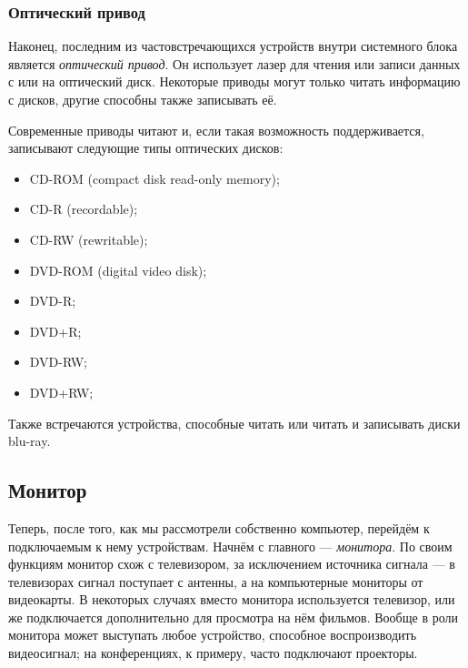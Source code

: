 \subsubsection{Оптический привод}\label{base:introduction:components:opticaldrive}
Наконец, последним из частовстречающихся устройств внутри системного блока является \emph{оптический привод}.
Он использует лазер для чтения или записи данных с или на оптический диск.
Некоторые приводы могут только читать информацию с дисков, другие способны также записывать её.

Современные приводы читают и, если такая возможность поддерживается, записывают следующие типы оптических дисков:
\begin{itemize}
 \item CD-ROM (compact disk read-only memory);
 \item CD-R (recordable);
 \item CD-RW (rewritable);
 \item DVD-ROM (digital video disk);
 \item DVD-R;
 \item DVD+R;
 \item DVD-RW;
 \item DVD+RW;
\end{itemize}
Также встречаются устройства, способные читать или читать и записывать диски blu-ray.

\subsection{Монитор}\label{base:introduction:components:monitor}
Теперь, после того, как мы рассмотрели собственно компьютер, перейдём к подключаемым к нему устройствам.
Начнём с главного --- \emph{монитора}.
По своим функциям монитор схож с телевизором, за исключением источника сигнала --- в телевизорах сигнал поступает с антенны, а на компьютерные мониторы от видеокарты.
В некоторых случаях вместо монитора используется телевизор, или же подключается дополнительно для просмотра на нём фильмов.
Вообще в роли монитора может выступать любое устройство, способное воспроизводить видеосигнал; на конференциях, к примеру, часто подключают проекторы.

